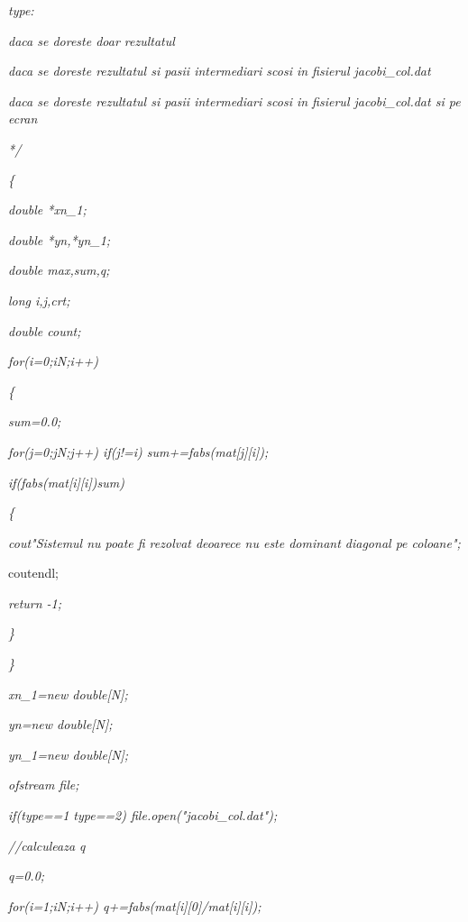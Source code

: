 \documentclass[a4paper,twoside]{book}
\begin{document}
\textit{\qquad type: }

\textit{ daca se doreste doar rezultatul}

\textit{ daca se doreste rezultatul si pasii intermediari scosi in
fisierul jacobi\_col.dat}

\textit{ daca se doreste rezultatul si pasii intermediari scosi in
fisierul jacobi\_col.dat si pe ecran}

\textit{*/}

\textit{\{}

\textit{\qquad double *xn\_1;}

\textit{\qquad double *yn,*yn\_1;}

\textit{\qquad double max,sum,q;}

\textit{\qquad long i,j,crt;}

\textit{\qquad double count;}

\textit{\qquad for(i=0;i\TEXTsymbol{<}N;i++)}

\textit{\qquad \{}

\textit{\qquad \qquad sum=0.0;}

\textit{\qquad \qquad for(j=0;j\TEXTsymbol{<}N;j++) if(j!=i)
sum+=fabs(mat[j][i]);}

\textit{\qquad \qquad if(fabs(mat[i][i])\TEXTsymbol{<}sum)}

\textit{\qquad \qquad \{}

\textit{\qquad \qquad \qquad cout\TEXTsymbol{<}\TEXTsymbol{<}"Sistemul nu
poate fi rezolvat deoarece nu este dominant diagonal pe coloane";}

\qquad \qquad \qquad cout\TEXTsymbol{<}\TEXTsymbol{<}endl;

\textit{\qquad \qquad \qquad return -1;}

\textit{\qquad \qquad \}}

\textit{\qquad \}}

\textit{\qquad xn\_1=new double[N];}

\textit{\qquad yn=new double[N];}

\textit{\qquad yn\_1=new double[N];}

\textit{\qquad ofstream file;}

\textit{\qquad if(type==1 \TEXTsymbol{\vert}\TEXTsymbol{\vert} type==2)
file.open("jacobi\_col.dat");}

\textit{\qquad //calculeaza q}

\textit{\qquad q=0.0;}

\textit{\qquad for(i=1;i\TEXTsymbol{<}N;i++) q+=fabs(mat[i][0]/mat[i][i]);}
\end{document}
